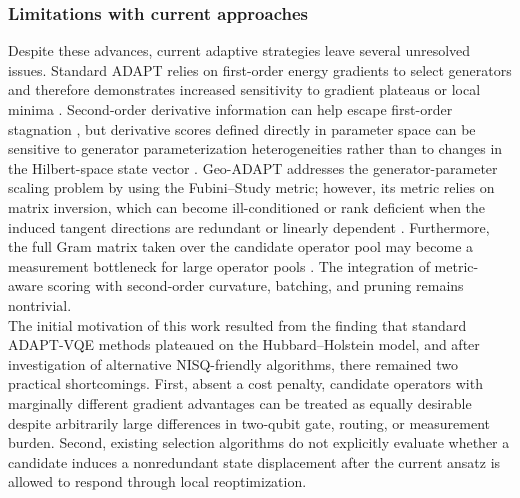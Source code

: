 \documentclass[
  reprint,
  amsmath,
  amssymb,
  aps,
  pra,
  nofootinbib,
  superscriptaddress,
  floatfix
]{revtex4-2}
\begin{document}
\subsubsection{Limitations with current approaches}
Despite these advances, current adaptive strategies leave several unresolved issues. Standard ADAPT relies on first-order energy gradients to select generators \cite{Grimsley2019,Tang2021,Yordanov2021} and therefore demonstrates increased sensitivity to gradient plateaus or local minima \cite{Feniou2023,Grimsley2023ADAPT}.
Second-order derivative information can help escape first-order stagnation \cite{Ramoa2025HessianRecycling}, but derivative scores defined directly in parameter space can be sensitive to generator parameterization heterogeneities rather than to changes in the Hilbert-space state vector \cite{ProvostVallee1980,Stokes2020QNG}. Geo-ADAPT addresses the generator-parameter scaling problem by using the Fubini--Study metric; however, its metric relies on matrix inversion, which can become ill-conditioned or rank deficient when the induced tangent directions are redundant or linearly dependent \cite{Sohail2026GeoADAPT}. Furthermore, the full Gram matrix taken over the candidate operator pool may become a measurement bottleneck for large operator pools \cite{Ramoa2025HessianRecycling,Ikhtiarudin2025ShotEfficient}. The integration of metric-aware scoring with second-order curvature, batching, and pruning remains nontrivial.\\
\noindent
The initial motivation of this work resulted from the finding that standard ADAPT-VQE methods plateaued on the Hubbard--Holstein model, and after investigation of alternative NISQ-friendly algorithms, there remained two practical shortcomings. First, absent a cost penalty, candidate operators with marginally different gradient advantages can be treated as equally desirable despite arbitrarily large differences in two-qubit gate, routing, or measurement burden. Second, existing selection algorithms do not explicitly evaluate whether a candidate induces a nonredundant state displacement after the current ansatz is allowed to respond through local reoptimization. 




%
\end{document}
